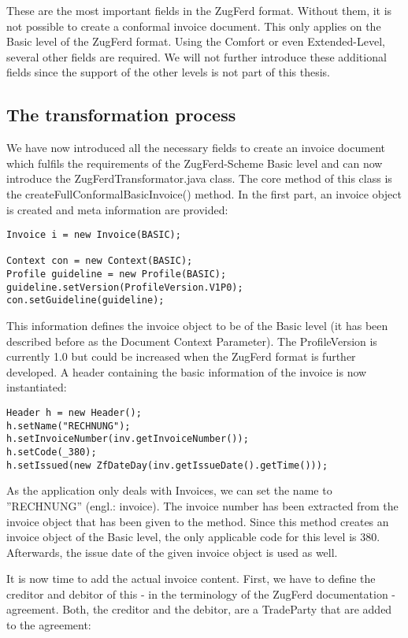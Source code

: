 These are the most important fields in the ZugFerd format. Without them, it is not possible to create a conformal invoice document. This only applies on the Basic level of the ZugFerd format. Using the Comfort or even Extended-Level, several other fields are required. We will not further introduce these additional fields since the support of the other levels is not part of this thesis. 

\subsection{The transformation process}

We have now introduced all the necessary fields to create an invoice document which fulfils the requirements of the ZugFerd-Scheme Basic level and can now introduce the ZugFerdTransformator.java class. The core method of this class is the createFullConformalBasicInvoice() method. 
In the first part, an invoice object is created and meta information are provided:

\begin{lstlisting}
Invoice i = new Invoice(BASIC);

Context con = new Context(BASIC);
Profile guideline = new Profile(BASIC);
guideline.setVersion(ProfileVersion.V1P0);
con.setGuideline(guideline);
\end{lstlisting}

This information defines the invoice object to be of the Basic level (it has been described before as the Document Context Parameter). The ProfileVersion is currently 1.0 but could be increased when the ZugFerd format is further developed.
A header containing the basic information of the invoice is now instantiated:

\begin{lstlisting}
Header h = new Header();
h.setName("RECHNUNG");
h.setInvoiceNumber(inv.getInvoiceNumber());
h.setCode(_380);
h.setIssued(new ZfDateDay(inv.getIssueDate().getTime()));
\end{lstlisting}

As the application only deals with Invoices, we can set the name to ''RECHNUNG'' (engl.: invoice). The invoice number has been extracted from the invoice object that has been given to the method.
Since this method creates an invoice object of the Basic level, the only applicable code for this level is 380. Afterwards, the issue date of the given invoice object is used as well.

It is now time to add the actual invoice content. First, we have to define the creditor and debitor of this - in the terminology of the ZugFerd documentation - agreement. Both, the creditor and the debitor, are a TradeParty that are added to the agreement:

